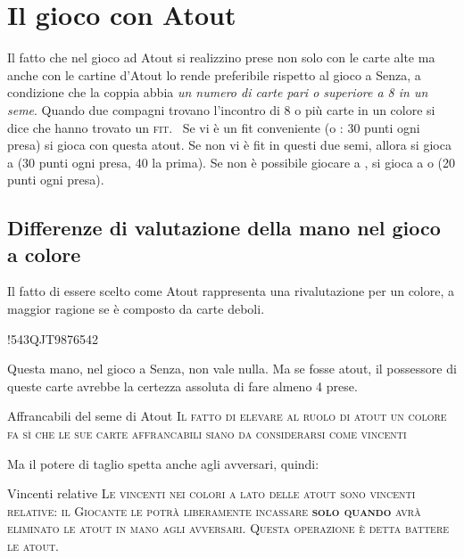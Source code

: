 \documentclass[../corsofiori.tex]{subfiles}
\begin{document}
\chapter{Il gioco con Atout}
Il fatto che nel gioco ad Atout si realizzino prese non solo con le carte alte ma anche con le cartine d'Atout lo rende
preferibile rispetto al gioco a Senza, a condizione che la coppia abbia \emph{un numero di carte pari o superiore a 8 in
un seme}. Quando due compagni trovano l'incontro di 8 o più carte in un colore si dice che hanno trovato un
\textsc{fit}.
\
Se vi è un fit conveniente (\Sp o \He{}: 30 punti ogni presa) si
gioca con questa atout. Se non vi è fit in questi due semi, allora si gioca a \SA (30 punti ogni presa, 40 la prima). Se
non è possibile giocare a \SA, si gioca a \Di o \Cl\sidefootnote{Questi colori si dicono \emph{minori}.} (20 punti ogni presa).

\section{Differenze di valutazione della mano nel gioco a colore}

Il fatto di essere scelto come Atout rappresenta una rivalutazione per un colore, a maggior ragione se è composto da
carte deboli.

\hand*!{543}{QJT987}{654}{2}

Questa mano, nel gioco a Senza, non vale nulla. Ma se \cu fosse atout, il possessore di queste carte avrebbe la certezza
assoluta di fare almeno 4 prese.
\begin{regola}{Affrancabili del seme di Atout}
    \textsc{Il fatto di elevare al ruolo di atout un colore fa sì che le sue carte affrancabili siano da considerarsi
    come vincenti}
\end{regola}
Ma il potere di taglio spetta anche agli avversari, quindi:

\begin{regola}{Vincenti relative}
    \textsc{Le vincenti nei colori a lato delle atout sono vincenti relative: il Giocante le potrà liberamente incassare
    \textbf{solo quando} avrà eliminato le atout in mano agli avversari. Questa operazione è detta battere le atout.}
\end{regola}

\newgame
{}
\leftupper{\boardtext*}%
{\dealertext\quad}{\vulnertext}
\end{document}
